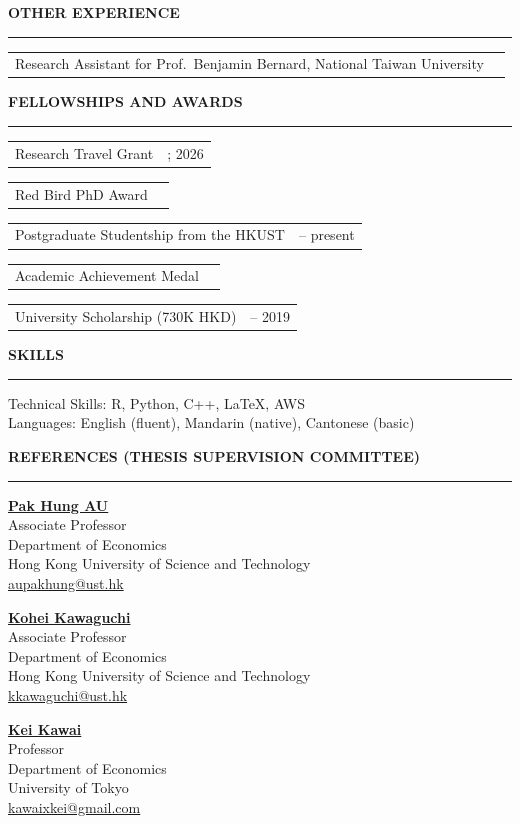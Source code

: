 \documentclass[11pt,letterpaper]{article}
\makeatletter
\newlength{\cvdatecol}
\newcommand{\sectionheader}[1]{%
  \vspace{0.32em}
  {\large\bfseries #1}\\[-0.15em]
  \rule{\textwidth}{0.4pt}\par
  \vspace{0.18em}
}
\newcommand{\cvline}[3][0em]{%
  \par\nobreak
  \noindent\hspace*{#1}%
  \begin{tabularx}{\dimexpr\textwidth-#1\relax}{@{}X@{\hspace{0.75em}}>{\raggedleft\arraybackslash}p{\cvdatecol}@{}}
  #2 & #3 \\
  \end{tabularx}%
}
\makeatother
\begin{document}
\sectionheader{OTHER EXPERIENCE}
{
\cvline[1.5em]{Research Assistant for Prof.\ Benjamin Bernard, National Taiwan University}{2020}
}

\sectionheader{FELLOWSHIPS AND AWARDS}
{
\cvline[1.5em]{Research Travel Grant}{2023; 2026}
\vspace{-0.1em}
\cvline[1.5em]{Red Bird PhD Award}{2022}
\vspace{-0.1em}
\cvline[1.5em]{Postgraduate Studentship from the HKUST}{2020 -- present}
\vspace{-0.1em}
\cvline[1.5em]{Academic Achievement Medal}{2019}
\vspace{-0.1em}
\cvline[1.5em]{University Scholarship (730K HKD)}{2015 -- 2019}
}

\sectionheader{SKILLS}
Technical Skills: R, Python, C++, \LaTeX, AWS\\
Languages: English (fluent), Mandarin (native), Cantonese (basic)

\sectionheader{REFERENCES (THESIS SUPERVISION COMMITTEE)}
{
\noindent
\begin{minipage}[t]{0.48\textwidth}
\textbf{\href{https://econ.hkust.edu.hk/faculty-and-staff/directory/aupakhung}{Pak Hung AU}}\\
Associate Professor\\
Department of Economics\\
Hong Kong University of Science and Technology\\
\href{mailto:aupakhung@ust.hk}{aupakhung@ust.hk}
\end{minipage}\hfill
\begin{minipage}[t]{0.48\textwidth}
\textbf{\href{https://www.kohei-kawaguchi.com/}{Kohei Kawaguchi}}\\
Associate Professor\\
Department of Economics\\
Hong Kong University of Science and Technology\\
\href{mailto:kkawaguchi@ust.hk}{kkawaguchi@ust.hk}
\end{minipage}

\vspace{0.45em}
\noindent
\begin{minipage}[t]{0.48\textwidth}
\textbf{\href{https://www.e.u-tokyo.ac.jp/fservice/faculty/kawai/kawai-e/kawai01-e.html}{Kei Kawai}}\\
Professor\\
Department of Economics\\
University of Tokyo\\
\href{mailto:kawaixkei@gmail.com}{kawaixkei@gmail.com}
\end{minipage}
}
\end{document}
